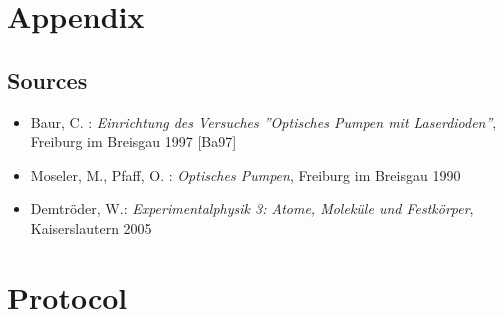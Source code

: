 \section{Appendix}

\begin{appendix}
\section{Sources}

\begin{itemize}
\item Baur, C. : \emph{Einrichtung des Versuches ''Optisches Pumpen mit Laserdioden''}, Freiburg im Breisgau 1997 [Ba97]
\item Moseler, M., Pfaff, O. : \emph{Optisches Pumpen}, Freiburg im Breisgau 1990
\item Demtröder, W.: \emph{Experimentalphysik 3: Atome, Moleküle und Festkörper}, Kaiserslautern 2005
\end{itemize}

\end{appendix}

\clearpage

\section{Protocol}